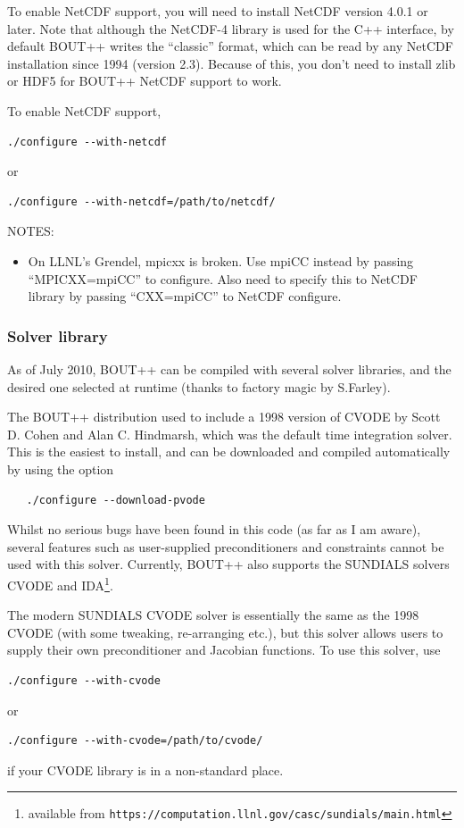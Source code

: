 \documentclass[12pt]{article}
\newcommand{\code}[1]{\texttt{#1}}
\begin{document}
To enable NetCDF support, you will need to install NetCDF version 4.0.1 or later. 
Note that although the NetCDF-4 library is used for the C++ interface, by default
BOUT++ writes the ``classic'' format, which can be read by any NetCDF installation
since 1994 (version 2.3). Because of this, you don't need to install zlib or HDF5
for BOUT++ NetCDF support to work.

To enable NetCDF support,
\begin{verbatim}
./configure --with-netcdf
\end{verbatim}
or
\begin{verbatim}
./configure --with-netcdf=/path/to/netcdf/
\end{verbatim}

NOTES:
\begin{itemize}
\item On LLNL's Grendel, mpicxx is broken. Use mpiCC instead by passing ``MPICXX=mpiCC'' to configure. Also need to specify this to NetCDF library by passing ``CXX=mpiCC'' to NetCDF configure.
\end{itemize}

\subsubsection{Solver library}
\label{sec:solverlibrary}

As of July 2010, BOUT++ can be compiled with several solver libraries, and the desired one
selected at runtime (thanks to factory magic by S.Farley).

The BOUT++ distribution used to include a 1998 version of CVODE by Scott D. Cohen and Alan C.
Hindmarsh, which was the default time integration solver. This is the easiest to install, and
can be downloaded and compiled automatically by using the option
\begin{verbatim}
   ./configure --download-pvode
\end{verbatim}
Whilst no serious bugs have been found in this code
(as far as I am aware), several features such as user-supplied preconditioners and constraints cannot
be used with this solver. Currently, BOUT++ also supports the SUNDIALS solvers CVODE and
IDA\footnote{available from \code{https://computation.llnl.gov/casc/sundials/main.html}}.

The modern SUNDIALS CVODE solver is essentially the same as the 1998 CVODE (with some tweaking,
re-arranging etc.), but this solver allows users to supply their own preconditioner 
and Jacobian functions. To use this solver, use
\begin{verbatim}
./configure --with-cvode
\end{verbatim}
or
\begin{verbatim}
./configure --with-cvode=/path/to/cvode/
\end{verbatim}
if your CVODE library is in a non-standard place.
\end{document}
